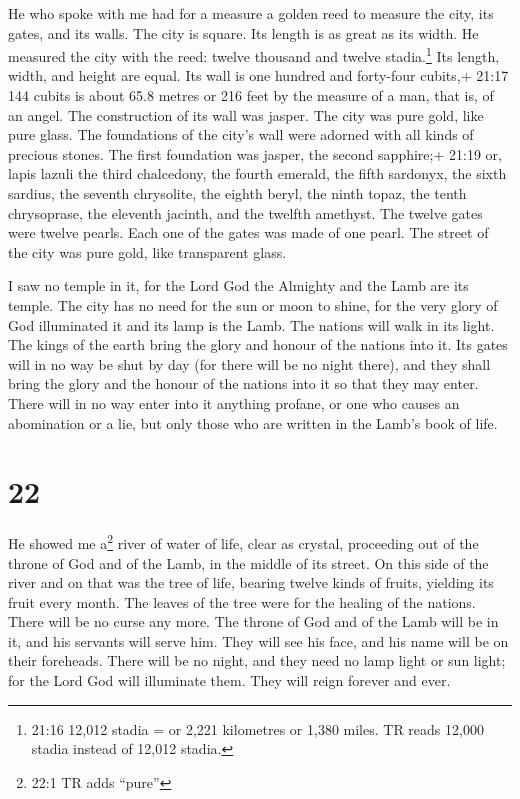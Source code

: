  He who spoke with me had for a measure a golden reed to
measure the city, its gates, and its walls.  The city is
square. Its length is as great as its width. He measured the city with
the reed: twelve thousand and twelve stadia.\footnote{21:16 12,012
  stadia = or 2,221 kilometres or 1,380 miles. TR reads 12,000 stadia
  instead of 12,012 stadia.} Its length, width, and height are equal.
 Its wall is one hundred and forty-four cubits,+ 21:17 144
cubits is about 65.8 metres or 216 feet by the measure of a man, that
is, of an angel.  The construction of its wall was jasper.
The city was pure gold, like pure glass.  The foundations
of the city's wall were adorned with all kinds of precious stones. The
first foundation was jasper, the second sapphire;+ 21:19 or, lapis
lazuli the third chalcedony, the fourth emerald,  the fifth
sardonyx, the sixth sardius, the seventh chrysolite, the eighth beryl,
the ninth topaz, the tenth chrysoprase, the eleventh jacinth, and the
twelfth amethyst.  The twelve gates were twelve pearls.
Each one of the gates was made of one pearl. The street of the city was
pure gold, like transparent glass.

 I saw no temple in it, for the Lord God the Almighty and
the Lamb are its temple.  The city has no need for the sun
or moon to shine, for the very glory of God illuminated it and its lamp
is the Lamb.  The nations will walk in its light. The kings
of the earth bring the glory and honour of the nations into it.
 Its gates will in no way be shut by day (for there will be
no night there),  and they shall bring the glory and the
honour of the nations into it so that they may enter. 
There will in no way enter into it anything profane, or one who causes
an abomination or a lie, but only those who are written in the Lamb's
book of life.

\hypertarget{section-21}{%
\section{22}\label{section-21}}

 He showed me a\footnote{22:1 TR adds ``pure''} river of
water of life, clear as crystal, proceeding out of the throne of God and
of the Lamb,  in the middle of its street. On this side of
the river and on that was the tree of life, bearing twelve kinds of
fruits, yielding its fruit every month. The leaves of the tree were for
the healing of the nations.  There will be no curse any
more. The throne of God and of the Lamb will be in it, and his servants
will serve him.  They will see his face, and his name will
be on their foreheads.  There will be no night, and they
need no lamp light or sun light; for the Lord God will illuminate them.
They will reign forever and ever.

